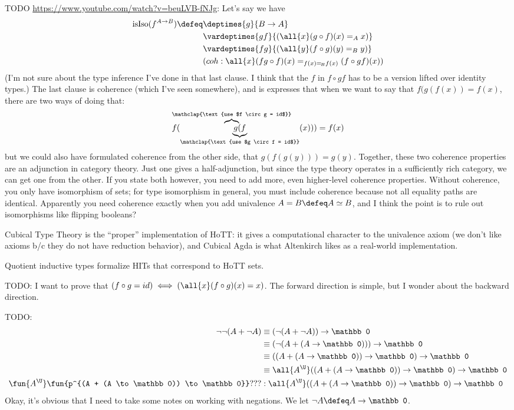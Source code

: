 \documentclass[11pt]{article} %
\theoremstyle{definition}
\theoremstyle{remark}
\begin{document}
TODO \url{https://www.youtube.com/watch?v=beuLVB-fNJg}:
Let's say we have
  \begin{align*}
  \mathrm{isIso}(f^{A \to B}) \defeq &
  \deptimes{g}{B \to A} \\&
  \vardeptimes{gf}{(\all{x}(g \circ f)(x) =_A x)} \\&
  \vardeptimes{fg}{(\all{y}(f \circ g)(y) =_B y)} \\&
  ( coh : \all{x} (fg \circ f)(x) =_{f(x) =_{\!B} f(x)} (f \circ gf)(x) )
  \end{align*}
(I'm not sure about the type inference I've done in that last clause. I think that the $f$ in $f \circ gf$ has to be a version lifted over identity types.)
The last clause is coherence (which I've seen somewhere), and is expresses that when we want to say that $f(g(f(x)) = f(x)$, there are two ways of doing that:
  $$\lefteqn{
    \overbrace{\phantom{f(g}}^{\mathclap{\text{use $f \circ g = id$}}}
  }
  f(\underbrace{g(f}_{\mathclap{\text{use $g \circ f = id$}}}(x))) = f(x)
  $$
but we could also have formulated coherence from the other side, that $g(f(g(y))) = g(y)$.
Together, these two coherence properties are an adjunction in category theory.
Just one gives a half-adjunction, but since the type theory operates in a sufficiently rich category, we can get one from the other.
If you state both however, you need to add more, even higher-level coherence properties.
Without coherence, you only have isomorphism of sets; for type isomorphism in general, you must include coherence because not all equality paths are identical.
Apparently you need coherence exactly when you add univalence $A = B \defeq A \simeq B$, and I think the point is to rule out isomorphisms like flipping booleans?


Cubical Type Theory is the ``proper'' implementation of HoTT: it gives a computational character to the univalence axiom (we don't like axioms b/c they do not have reduction behavior), and Cubical Agda is what Altenkirch likes as a real-world implementation.

Quotient inductive types formalize HITs that correspond to HoTT sets.

TODO:
I want to prove that $(f \circ g = id) \iff (\all{x} (f \circ g)(x) = x)$.
The forward direction is simple, but I wonder about the backward direction.


TODO:
\begin{align*}
\lnot\lnot(A + \lnot A)
  &\equiv (\lnot(A + \lnot A)) \to \mathbb 0 \\
  &\equiv (\lnot(A + (A \to \mathbb 0))) \to \mathbb 0 \\
  &\equiv ((A + (A \to \mathbb 0)) \to \mathbb 0) \to \mathbb 0 \\
  &\equiv \all{A^\U} ((A + (A \to \mathbb 0)) \to \mathbb 0) \to \mathbb 0 \\
\fun{A^\U}\fun{p^{(A + (A \to \mathbb 0)) \to \mathbb 0}} ???
  &: \all{A^\U} ((A + (A \to \mathbb 0)) \to \mathbb 0) \to \mathbb 0 \\
\end{align*}
Okay, it's obvious that I need to take some notes on working with negations.
We let $\lnot A \defeq A \to \mathbb 0$.
\end{document}
